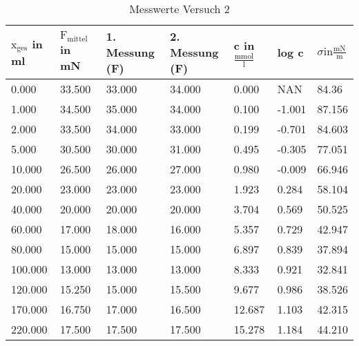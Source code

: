             \begin{table}[H]
                \centering
                \caption{Messwerte Versuch 2}
                \label{tab:Versuch2_Ergebnisse}
                \vspace{0.8em}
                \begin{tabular}{|l|l|l|l|l|l|l|}
                    \hline
                    $\mathrm{x_{ges}}$ in ml & $\mathrm{F_{mittel}}$ in mN & 1. Messung (F) & 2. Messung (F) & c in $\frac{\mathrm{mmol}}{\mathrm{l}}$ & log c & $\sigma \mathrm{ in } \frac{\mathrm{mN}}{\mathrm{m}}$ \\ 
                    \hline
                    0.000 & 33.500 & 33.000 & 34.000 & 0.000 & NAN & 84.36 \\
                    \hline
                    1.000 & 34.500 & 35.000 & 34.000 & 0.100 & -1.001 & 87.156 \\
                    \hline
                    2.000 & 33.500 & 34.000 & 33.000 & 0.199 & -0.701 & 84.603 \\
                    \hline
                    5.000 & 30.500 & 30.000 & 31.000 & 0.495 & -0.305 & 77.051 \\ 
                    \hline
                    10.000 & 26.500 & 26.000 & 27.000 & 0.980 & -0.009 & 66.946 \\
                    \hline
                    20.000 & 23.000 & 23.000 & 23.000 & 1.923 & 0.284 & 58.104 \\
                    \hline
                    40.000 & 20.000 & 20.000 & 20.000 & 3.704 & 0.569 & 50.525 \\
                    \hline
                    60.000 & 17.000 & 18.000 & 16.000 & 5.357 & 0.729 & 42.947\\
                    \hline
                    80.000 & 15.000 & 15.000 & 15.000 & 6.897 & 0.839 & 37.894\\
                    \hline
                    100.000 & 13.000 & 13.000 & 13.000 &  8.333 & 0.921 & 32.841\\

                    \hline
                    120.000 & 15.250 & 15.000 & 15.500 & 9.677 & 0.986 & 38.526\\
                    \hline
                    170.000 & 16.750 & 17.000 & 16.500 & 12.687 & 1.103 & 42.315\\
                    \hline
                    220.000 & 17.500 & 17.500 & 17.500 & 15.278 & 1.184 & 44.210\\
                    \hline
                \end{tabular}
            \end{table}

